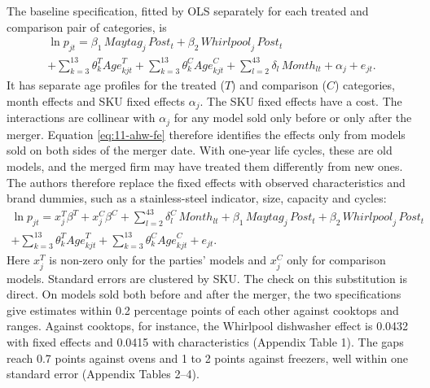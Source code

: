  The baseline specification, fitted by OLS separately for each treated and
comparison pair of categories, is
\begin{multline}\label{eq:11-ahw-fe}
\ln p_{jt}=\beta_1\,\mathit{Maytag}_j\,\mathit{Post}_t+\beta_2\,\mathit{Whirlpool}_j\,\mathit{Post}_t\\
+\sum_{k=3}^{13}\theta_k^{T}\mathit{Age}^{T}_{kjt}+\sum_{k=3}^{13}\theta_k^{C}\mathit{Age}^{C}_{kjt}+\sum_{l=2}^{43}\delta_l\,\mathit{Month}_{lt}+\alpha_j+e_{jt}.
\end{multline}
It has separate age profiles for the treated ($T$) and comparison ($C$) categories, month effects and SKU fixed
effects $\alpha_j$. The SKU fixed effects have a cost. The interactions are collinear with $\alpha_j$ for any model
sold only before or only after the merger. Equation \eqref{eq:11-ahw-fe} therefore identifies the effects only from
models sold on both sides of the merger date. With one-year life cycles, these are old models, and the merged firm may have
treated them differently from new ones. The authors therefore replace the fixed effects with observed
characteristics and brand dummies, such as a stainless-steel indicator, size, capacity and cycles:
\begin{multline}\label{eq:11-ahw-char}
\ln p_{jt}=x^{T}_{j}\beta^{T}+x^{C}_{j}\beta^{C}+\sum_{l=2}^{43}\delta^{C}_l\,\mathit{Month}_{lt}+\beta_1\,\mathit{Maytag}_j\,\mathit{Post}_t+\beta_2\,\mathit{Whirlpool}_j\,\mathit{Post}_t\\
+\sum_{k=3}^{13}\theta_k^{T}\mathit{Age}^{T}_{kjt}+\sum_{k=3}^{13}\theta_k^{C}\mathit{Age}^{C}_{kjt}+e_{jt}.
\end{multline}
Here $x^T_j$ is non-zero only for the parties' models and $x^C_j$ only for comparison models. Standard errors
are clustered by SKU. The check on this substitution is direct. On models sold both before and after the merger,
the two specifications give estimates within 0.2 percentage points of each other against cooktops and ranges.
Against cooktops, for instance, the Whirlpool dishwasher effect is 0.0432 with fixed effects and 0.0415 with
characteristics (Appendix Table 1). The gaps reach 0.7 points against ovens and 1 to 2 points against freezers, well
within one standard error (Appendix Tables 2--4).

